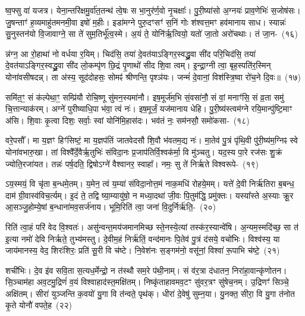 ष्व॒फ्सु वा॑ यजत्र। येना॒न्तरि॑क्षमु॒र्वा॑त॒तन्थ॑ त्वे॒षः स भा॒नुर॑र्ण॒वो नृ॒चक्षाः᳚। पु॒री॒ष्या॑सो अ॒ग्नयः॑ प्राव॒णेभिः॑ स॒जोष॑सः। जु॒षन्ताꣳ॑ ह॒व्यमाहु॑तमनमी॒वा इषो॑ म॒हीः। इडा॑मग्ने पुरु॒दꣳसꣳ॑ स॒निं गोः श॑श्वत्त॒मꣳ हव॑मानाय साध। स्यान्नः॑ सु॒नुस्तन॑यो वि॒जावाग्ने॒ सा ते॑ सुम॒तिर्भू᳚त्व॒स्मे। अ॒यं ते॒ योनि॑र्\mbox{}ऋ॒त्वियो॒ यतो॑ जा॒तो अरो॑चथाः। तं जा॒न-~(१६)\ip

न्न॑ग्न॒ आ रो॒हाथा॑ नो वर्धया र॒यिम्। चिद॑सि॒ तया॑ दे॒वत॑या\-ऽ\-ङ्गिर॒स्वद्ध्रु॒वा सी॑द परि॒चिद॑सि॒ तया॑ दे॒वत॑या\-ऽङ्गिर॒स्वद्ध्रु॒वा सी॑द लो॒कम्पृ॑ण छि॒द्रं पृ॒णाथो॑ सीद शि॒वा त्वम्। इ॒न्द्रा॒ग्नी त्वा॒ बृह॒स्पति॑र॒स्मिन् योना॑वसीषदन्न्। ता अ॑स्य॒ सूद॑दोहसः॒ सोमꣴ॑ श्रीणन्ति॒ पृश्ञ॑यः। जन्मं॑ दे॒वानां॒ विश॑स्त्रि॒ष्वा रो॑च॒ने दि॒वः॥~(१७)\ip

{\anuvakamend[{अ॒स्त्वोष॑धीषु जा॒नन्न॒ष्टाच॑त्वारिꣳशच्च}]}

समि॑त॒ꣳ॒ सं क॑ल्पेथा॒ꣳ॒ सम्प्रि॑यौ रोचि॒ष्णू सु॑मन॒स्यमा॑नौ। इष॒मूर्ज॑म॒भि सं॒वसा॑नौ॒ सं वां॒ मनाꣳ॑सि॒ सं व्र॒ता समु॑ चि॒त्तान्याक॑रम्। अग्ने॑ पुरीष्याधि॒पा भ॑वा॒ त्वं नः॑। इष॒मूर्जं॒ यज॑मानाय धेहि। पु॒री॒ष्य॑स्त्वम॑ग्ने रयि॒मान्पु॑ष्टि॒माꣳ अ॑सि। शि॒वाः कृ॒त्वा दिशः॒ सर्वाः॒ स्वां योनि॑मि॒हास॑दः। भव॑तं नः॒ सम॑नसौ॒ समो॑कसा-~(१८)\ip

वरे॒पसौ᳚। मा य॒ज्ञꣳ हिꣳ॑सिष्टं॒ मा य॒ज्ञप॑तिं जातवेदसौ शि॒वौ भ॑वतम॒द्य नः॑। मा॒तेव॑ पु॒त्रं पृ॑थि॒वी पु॑री॒ष्य॑म॒ग्निꣴ स्वे योना॑वभारु॒खा। तां विश्वै᳚र्दे॒वैर्\mbox{}ऋ॒तुभिः॑ संविदा॒नः प्र॒जा\-प॑तिर्वि॒श्वक॑र्मा॒ वि मु॑ञ्चतु। यद॒स्य पा॒रे रज॑सः शु॒क्रं ज्योति॒रजा॑यत। तन्नः॑ पर्\mbox{}ष॒दति॒ द्विषो\-ऽग्ने॑ वैश्वानर॒ स्वाहा᳚। नमः॒ सु ते॑ निर्\mbox{}ऋते विश्वरूपे-~(१९)\ip

ऽय॒स्मयं॒ वि चृ॑ता ब॒न्धमे॒तम्। य॒मेन॒ त्वं य॒म्या॑ संविदा॒नोत्त॒मं नाक॒मधि॑ रोहये॒मम्। यत्ते॑ दे॒वी निर्\mbox{}ऋ॑तिरा ब॒बन्ध॒ दाम॑ ग्री॒वास्व॑विच॒र्त्यम्। इ॒दं ते॒ तद्वि ष्या॒म्यायु॑षो॒ न मध्या॒दथा॑ जी॒वः पि॒तुम॑द्धि॒ प्रमु॑क्तः। यस्या᳚स्ते अ॒स्याः क्रू॒र आ॒सञ्जु॒होम्ये॒षां ब॒न्धाना॑मव॒सर्ज॑नाय। भूमि॒रिति॑ त्वा॒ जना॑ वि॒दुर्निर्\mbox{}ऋ॑ति॒-~(२०)\ip

रिति॑ त्वा॒हं परि॑ वेद वि॒श्वतः॑। असु॑न्वन्त॒मय॑जमानमिच्छ स्ते॒नस्ये॒त्यां तस्क॑र॒स्यान्वे॑षि। अ॒न्यम॒स्मदि॑च्छ॒ सा त॑ इ॒त्या नमो॑ देवि निर्\mbox{}ऋते॒ तुभ्य॑मस्तु। दे॒वीम॒हं निर्\mbox{}ऋ॑तिं॒ वन्द॑मानः पि॒तेव॑ पु॒त्रं द॑सये॒ वचो॑भिः। विश्व॑स्य॒ या जाय॑मानस्य॒ वेद॒ शिरः॑शिरः॒ प्रति॑ सू॒री वि च॑ष्टे। नि॒वेश॑नः स॒ङ्गम॑नो॒ वसू॑नां॒ विश्वा॑ रू॒पाभि च॑ष्टे॒~(२१)\ip

शची॑भिः। दे॒व इ॑व सवि॒ता स॒त्यध॒र्मेन्द्रो॒ न त॑स्थौ सम॒रे प॑थी॒नाम्। सं व॑र॒त्रा द॑धातन॒ निरा॑हा॒वान्कृ॑णोतन। सि॒ञ्चाम॑हा अव॒टमु॒द्रिणं॑ व॒यं विश्वाहाद॑स्त॒मक्षि॑तम्। निष्कृ॑ताहावमव॒टꣳ सु॑वर॒त्रꣳ सु॑षेच॒नम्। उ॒द्रिणꣳ॑ सिञ्चे॒ अक्षि॑तम्। सीरा॑ युञ्जन्ति क॒वयो॑ यु॒गा वि त॑न्वते॒ पृथ॑क्। धीरा॑ दे॒वेषु॑ सुम्न॒या। यु॒नक्त॒ सीरा॒ वि यु॒गा त॑नोत कृ॒ते योनौ॑ वपते॒ह~(२२)\ip

